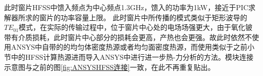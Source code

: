\documentclass[master]{thesis-uestc}
\begin{document}
\begin{table}[!htb]
    \caption{BeO材料属性}
    \label{tab:BeOStateOfArt}
\end{table}

此时窗片HFSS中馈入频点为中心频点1.3GHz，馈入的功率为1kW，接近于PIC求解器所求的窗片的功率容量上限。
此时窗片中所传播的模式类似于矩形波导的\(TE_{01}\)模式，在实际的传输过程中，位于窗片中心处的电场场强更大，由于氧化铍带有介质损耗，此时窗片中心部分的损耗会更高，产热也会更强。故此时依然不使用ANSYS中自带的的均匀体密度热源或者均匀面密度热源，而使用类似于之前小节中的HFSS计算热源进而导入ANSYS中进行进一步热-力分析的方法。模块连接示意图与之前的图\ref{fig:ANSYSHFSS连接}一致，在此不再重复贴出。
\end{document}
